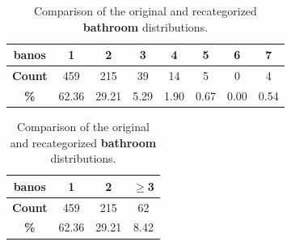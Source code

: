 \documentclass[11pt]{report} %
\begin{document}
\begin{table}[H]
    \centering
    \begin{minipage}{0.45\textwidth}
        \centering
        \begin{tabular}{cccccccc}
            \toprule
            \textbf{banos} & \textbf{1} & \textbf{2} & \textbf{3} & \textbf{4} & \textbf{5} & \textbf{6} & \textbf{7} \\ 
            \midrule
            \textbf{Count}       & 459    & 215    & 39     & 14     & 5      & 0      & 4      \\
            \textbf{\%}  & 62.36  & 29.21  & 5.29   & 1.90   & 0.67   & 0.00   & 0.54   \\ 
            \bottomrule
        \end{tabular}
    \end{minipage}
    \hfill
    \begin{minipage}{0.45\textwidth}
        \centering
        \begin{tabular}{cccc}
            \toprule
            \textbf{banos} & \textbf{1} & \textbf{2} & \textbf{$\geq$3} \\ 
            \midrule
            \textbf{Count}       & 459    & 215    & 62      \\ 
            \textbf{\%}  & 62.36  & 29.21  & 8.42    \\ 
            \bottomrule
        \end{tabular}
    \end{minipage}
    \caption{Comparison of the original and recategorized \textbf{bathroom} distributions.}
    \label{tab:side_by_side_distribution}
\end{table}
\end{document}
